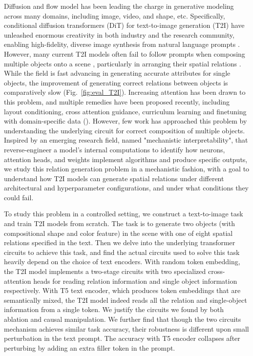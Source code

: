 \documentclass[10pt,twocolumn,letterpaper]{article}
\begin{document}
Diffusion and flow model \citep{dickstein2015noneq,Dhariwal2021Diffusion,ho2020DDPM,Lipman2023Flow,Albergo2023Stochastic} has been leading the charge in generative modeling across many domains, including image, video, and shape\cite{Ho2022video}, etc. 
Specifically, conditional diffusion transformers (DiT) for text-to-image generation (T2I) have unleashed enormous creativity in both industry and the research community, enabling high-fidelity, diverse image synthesis from natural language prompts \cite{rombach2022latentdiff}. 
However, many current T2I models often fail to follow prompts when composing multiple objects onto a scene \citep{Conwell2022Testing}, particularly in arranging their spatial relations \citep{huang2023t2icompbench,ghosh2023genevalobjectfocusedframeworkevaluating,huang2025t2icompbench++}. While the field is fast advancing in generating accurate attributes for single objects, the improvement of generating correct relations between objects is comparatively slow (Fig.~\ref{fig:eval_T2I}).
Increasing attention has been drawn to this problem, and multiple remedies have been proposed recently, including layout conditioning, cross attention guidance, curriculum learning and finetuning with domain-specific data (\cite{li2023gligenopensetgroundedtexttoimage,
chefer2023attendandexciteattentionbasedsemanticguidance,
chatterjee2024gettingrightimprovingspatial,
han2025progressive}). 
However, few work has approached this problem by understanding the underlying circuit for correct composition of multiple objects. 
Inspired by an emerging research field, named "mechanistic interpretability", that reverse-engineer a model’s internal computations to identify how neurons, attention heads, and weights implement algorithms and produce specific outputs, we study this relation generation problem in a mechanistic fashion, with a goal to understand how T2I models can generate spatial relations under different architectural and hyperparameter configurations, and under what conditions they could fail.

To study this problem in a controlled setting, we construct a text-to-image task and train T2I models from scratch. The task is to generate two objects (with compositional shape and color feature) in the scene with one of eight spatial relations specified in the text. Then we delve into the underlying transformer circuits to achieve this task, and find the actual circuits used to solve this task heavily depend on the choice of text encoders. With random token embedding, the T2I model implements a two-stage circuits with two specialized cross-attention heads for reading relation information and single object information respectively. With T5 text encoder, which produces token embeddings that are semantically mixed, the T2I model indeed reads all the relation and single-object information from a single token. We justify the circuits we found by both ablation and causal manipulation. We further find that though the two circuits mechanism achieves similar task accuracy, their robustness is different upon small perturbation in the text prompt. The accuracy with T5 encoder collapses after perturbing by adding an extra filler token in the prompt.
\end{document}
